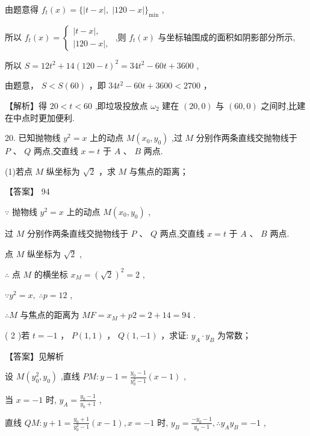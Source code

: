 \documentclass[10pt]{article}
\begin{document}
由题意得 \({f}_{t}\left( x\right)  = \{ \left| {t - x}\right| ,\;\left| {{120} - x}\right| {\} }_{\min }\) ,

所以 \({f}_{t}\left( x\right)  = \left\{  \begin{array}{l} \left| {t - x}\right| , \\  \left| {{120} - x}\right| , \end{array}\right.\) ,则 \({f}_{t}\left( x\right)\) 与坐标轴围成的面积如阴影部分所示,

所以 \(S = {12}{t}^{2} + {14}{\left( {120} - t\right) }^{2} = {34}{t}^{2} - {60t} + {3600}\) ,

由题意， \(S < S\left( {60}\right)\) ，即 \({{34}{t}^{2} - {60t} + {3600}} < {2700}\) ，

【解析】得 \({20} < t < {60}\) ,即垃圾投放点 \({\omega }_{2}\) 建在 \(\left( {{20},0}\right)\) 与 \(\left( {{60},0}\right)\) 之间时,比建在中点时更加便利.

20. 已知抛物线 \({y}^{2} = x\) 上的动点 \(M\left( {{x}_{0},{y}_{0}}\right)\) ,过 \(M\) 分别作两条直线交抛物线于 \(P\text{ 、 }Q\) 两点,交直线 \(x = t\) 于 \(A\text{ 、 }B\) 两点.

(1)若点 \(M\) 纵坐标为 \(\sqrt{2}\) ，求 \(M\) 与焦点的距离；

【答案】 94

\(\because\) 抛物线 \({y}^{2} = x\) 上的动点 \(M\left( {{x}_{0},{y}_{0}}\right)\) ,

过 \(M\) 分别作两条直线交抛物线于 \(P\text{ 、 }Q\) 两点,交直线 \(x = t\) 于 \(A\text{ 、 }B\) 两点.

点 \(M\) 纵坐标为 \(\sqrt{2}\) ,

\(\therefore\) 点 \(M\) 的横坐标 \({x}_{M} = {\left( \sqrt{2}\right) }^{2} = 2\) ,

\(\because {y}^{2} = x,\;\therefore p = {12}\) ,

\(\therefore M\) 与焦点的距离为 \({MF} = {x}_{M} + {p2} = 2 + {14} = {94}\) .

( 2 )若 \(t =  - 1\) ， \(P\left( {1,1}\right)\) ， \(Q\left( {1, - 1}\right)\) ，求证: \({y}_{A} \cdot  {y}_{B}\) 为常数；

【答案】见解析

设 \(M\left( {{y}_{0}^{2},{y}_{0}}\right)\) ,直线 \({PM} : y - 1 = \frac{{y}_{0} - 1}{{y}_{0}^{2} - 1}\left( {x - 1}\right)\) ,

当 \(x =  - 1\) 时, \({y}_{A} = \frac{{y}_{0} - 1}{{y}_{0} + 1}\) ,

直线 \({QM} : y + 1 = \frac{{y}_{0} + 1}{{y}_{0}^{2} - 1}\left( {x - 1}\right) ,x =  - 1\) 时, \({y}_{B} = \frac{-{y}_{0} - 1}{{y}_{0} - 1},\therefore {y}_{A}{y}_{B} =  - 1\) ,
\end{document}

